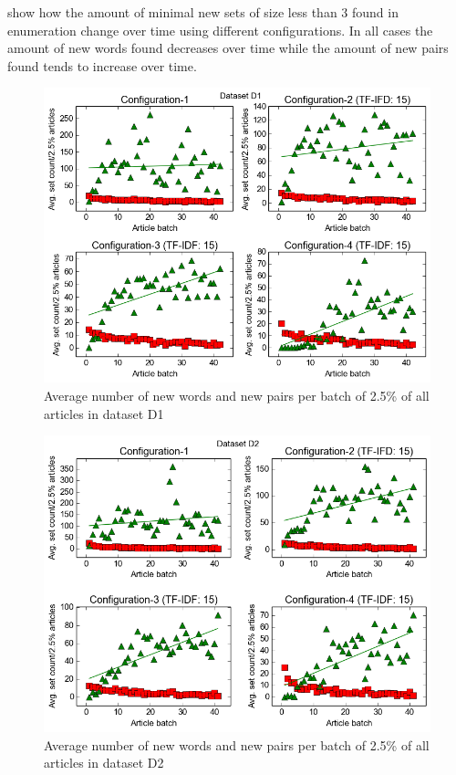  show how the amount of minimal new sets of size less than 3 found in enumeration change over time using different configurations. In all cases the amount of new words found decreases over time while the amount of new pairs found tends to increase over time.

\begin{figure}[ht]
  \centering
  \includegraphics[scale=0.70]{images/D1-plot.png}
  \caption{Average number of new words and new pairs per batch of 2.5\% of all articles in dataset D1}
  \label{fig:setPlot1}
\end{figure}

\begin{figure}[ht]
  \centering
  \includegraphics[scale=0.70]{images/D2-plot.png}
  \caption{Average number of new words and new pairs per batch of 2.5\% of all articles in dataset D2}
  \label{fig:setPlot2}
\end{figure}

